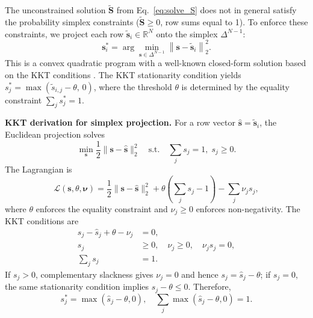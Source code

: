 \documentclass[review,12pt,authoryear]{elsarticle}
\begin{document}
The unconstrained solution $\tilde{\mathbf{S}}$ from Eq.~\eqref{eq:solve_S} does not in general satisfy the probability simplex constraints ($\tilde{\mathbf{S}} \geq 0$, row sums equal to 1).
To enforce these constraints, we project each row $\tilde{\mathbf{s}}_i \in \mathbb{R}^N$ onto the simplex $\Delta^{N-1}$:
\begin{equation}
    \mathbf{s}_i^* = \arg\min_{\mathbf{s} \in \Delta^{N-1}} \left\| \mathbf{s} - \tilde{\mathbf{s}}_i \right\|_2^2.
    \label{eq:simplex_proj}
\end{equation}
This is a convex quadratic program with a well-known closed-form solution based on the KKT conditions \citep{duchi2008efficient}.
The KKT stationarity condition yields $s_j^* = \max(\tilde{s}_{i,j} - \theta, \, 0)$, where the threshold $\theta$ is determined by the equality constraint $\sum_j s_j^* = 1$.

\textbf{KKT derivation for simplex projection.}
For a row vector $\hat{\mathbf{s}} = \tilde{\mathbf{s}}_i$, the Euclidean projection solves
\begin{equation}
    \min_{\mathbf{s}} \frac{1}{2}\|\mathbf{s} - \hat{\mathbf{s}}\|_2^2
    \quad \text{s.t.} \quad
    \sum_j s_j = 1,\; s_j \geq 0.
    \label{eq:simplex_kkt_obj}
\end{equation}
The Lagrangian is
\begin{equation}
    \mathcal{L}(\mathbf{s}, \theta, \bm{\nu})
    = \frac{1}{2}\|\mathbf{s} - \hat{\mathbf{s}}\|_2^2
    + \theta\left(\sum_j s_j - 1\right)
    - \sum_j \nu_j s_j,
    \label{eq:simplex_lagrangian}
\end{equation}
where $\theta$ enforces the equality constraint and $\nu_j \geq 0$ enforces non-negativity.
The KKT conditions are
\begin{align}
    s_j - \hat{s}_j + \theta - \nu_j &= 0, \label{eq:simplex_stationarity} \\
    s_j &\geq 0,\quad \nu_j \geq 0,\quad \nu_j s_j = 0, \label{eq:simplex_complementarity} \\
    \sum_j s_j &= 1. \label{eq:simplex_sum}
\end{align}
If $s_j > 0$, complementary slackness gives $\nu_j = 0$ and hence $s_j = \hat{s}_j - \theta$; if $s_j = 0$, the same stationarity condition implies $\hat{s}_j - \theta \leq 0$.
Therefore,
\begin{equation}
    s_j^* = \max(\hat{s}_j - \theta, 0),
    \quad
    \sum_j \max(\hat{s}_j - \theta, 0) = 1.
    \label{eq:simplex_solution}
\end{equation}
\end{document}
